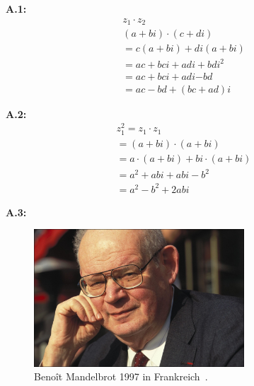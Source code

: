 \renewcommand{\theequation}{A.\arabic{equation}}
\renewcommand{\thefigure}{A.\arabic{figure}}

\noindent\textbf{A.1:}\label{app:1}
\begin{equation}\label{eq:complex-numbers-multiplication}
  \begin{split}
    z_1 \cdot z_2 \\
    (a + bi) \cdot (c + di) \\
    =  c(a + bi) + di(a + bi) \\
    = ac +bci + adi + bdi^2 \\
    = ac + bci + adi \boldsymbol{ - } bd \\
    = ac - bd +(bc + ad)i
  \end{split}
\end{equation}

\noindent\textbf{A.2:}\label{app:2}
\begin{equation}\label{eq:complex-numbes-squaring}
  \begin{split}
    z_1^2
    = z_1 \cdot z_1 \\
    = (a + bi) \cdot (a + bi) \\
    = a \cdot (a + bi) + bi \cdot (a + bi) \\
    = a^2 + abi + abi - b^2 \\
    = a^2 - b^2 + 2abi
  \end{split}
\end{equation}

\noindent\textbf{A.3:}\label{app:3}
\begin{figure}[H]\label{fig:benoit-mandelbrot-picture}
\begin{center}
  \includegraphics[width=0.7\textwidth]{images/benoit-mandelbrot}
  \caption{Benoît Mandelbrot 1997 in Frankreich~\cite{gaillarde_benoit_1997}.}
\end{center}
\end{figure}

